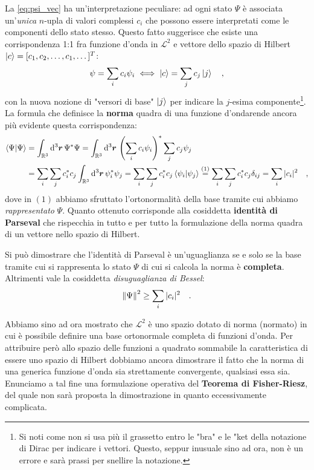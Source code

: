La \eqref{eq:psi_vec} ha un'interpretazione peculiare: ad ogni stato $\Psi$ è associata un'\textit{unica} $n$-upla di valori complessi $c_i$ che possono essere interpretati come le componenti dello stato stesso. Questo fatto suggerisce che esiste una corrispondenza 1:1 fra funzione d'onda in $\mathcal{L}^2$ e vettore dello spazio di Hilbert $\ket{c} = [c_1, c_2, \dots, c_1, \dots]^T$:
\[
    \psi = \sum_i c_i \psi_i \iff \ket{c} = \sum_j c_j\ket{j} \quad,
\]
con la nuova nozione di "versori di base" $\ket{j}$ per indicare la $j$-esima componente\footnote{Si noti come non si usa più il grassetto entro le "bra" e le "ket della notazione di Dirac per indicare i vettori. Questo, seppur inusuale sino ad ora, non è un errore e sarà prassi per snellire la notazione.}. La formula che definisce la \textbf{norma} quadra di una funzione d'ondarende ancora più evidente questa corrispondenza:
\[
    \begin{aligned}
        \bra{\Psi}\ket{\Psi} &= \int_{\mathbb{R}^3} \dd^3{\bm{r}} \, \Psi^* \Psi = \int_{\mathbb{R}^3} \dd^3{\bm{r}} \, \left(\sum_i c_i \psi_i \right)^*\sum_j c_j \psi_j \\
        &= \sum_i \sum_j c_i^* c_j \int_{\mathbb{R}^3} \dd^3{\bm{r}} \, \psi_i^* \psi_j = \sum_i \sum_j c_i^* c_j \bra{\psi_i}\ket{\psi_j} \overset{(1)}{=} \sum_i \sum_j c_i^* c_j \delta_{ij} = \sum_i |c_i|^2 \quad,
    \end{aligned}
\] 
dove in $(1)$ abbiamo sfruttato l'ortonormalità della base tramite cui abbiamo \emph{rappresentato} $\Psi$. Quanto ottenuto corrisponde alla cosiddetta \textbf{identità di Parseval} che rispecchia in tutto e per tutto la formulazione della norma quadra di un vettore nello spazio di Hilbert. 

\begin{approfondimento}[title={Limiti di validità dell'identità di Parseval}]
    \noindent
    Si può dimostrare che l'identità di Parseval è un'uguaglianza se e solo se la base tramite cui si rappresenta lo stato $\Psi$ di cui si calcola la norma è \textbf{completa}. Altrimenti vale la cosiddetta \emph{disuguaglianza di Bessel}:
    \[
        \norm{\Psi}^2 \geq \sum_i |c_i|^2 \quad.
    \]
\end{approfondimento}
Abbiamo sino ad ora mostrato che $\mathcal{L}^2$ è uno spazio dotato di norma (normato) in cui è possibile definire una base ortonormale completa di funzioni d'onda. Per attribuire però allo spazio delle funzioni a quadrato sommabile la caratteristica di essere uno spazio di Hilbert dobbiamo ancora dimostrare il fatto che la norma di una generica funzione d'onda sia strettamente convergente, qualsiasi essa sia. Enunciamo a tal fine una formulazione operativa del \textbf{Teorema di Fisher-Riesz}, del quale non sarà proposta la dimostrazione in quanto eccessivamente complicata.

